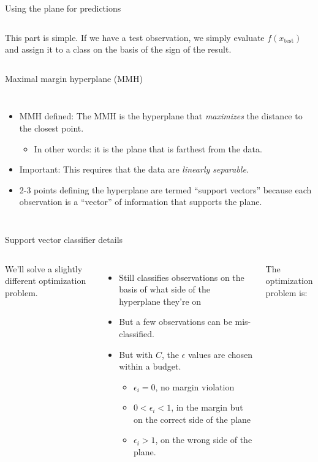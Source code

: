\documentclass[mathserif, aspectratio=169]{beamer}
\begin{document}
\begin{frame}{Using the plane for predictions}
	\begin{columns}
		This part is simple.  If we have a test observation, we simply evaluate $f(x_\text{test})$ and assign it to a class on the basis of the sign of the result.

	\end{columns}
\end{frame}


\begin{frame}{Maximal margin hyperplane (MMH)}

	\begin{columns}
		\column{0.5\textwidth}
		\begin{itemize}
			\item MMH defined: The MMH is the hyperplane that \textit{maximizes} the distance to the closest point.
			      \begin{itemize}
				      \item In other words: it is the plane that is farthest from the data.
			      \end{itemize}
			\item Important: This requires that the data are \textit{linearly separable.  }
			\item 2-3 points defining the hyperplane are termed ``support vectors'' because each observation is a ``vector'' of information that supports the plane.
		\end{itemize}
		\column{0.5\textwidth}

	\end{columns}
\end{frame}



\begin{frame}{Support vector classifier details}

	\begin{columns}
		We'll solve a slightly different optimization problem.
		\begin{itemize}
			\item Still classifies observations on the basis of what side of the hyperplane they're on
			\item But a few observations can be mis-classified.
			\item But with $C$, the $\epsilon$ values are chosen within a budget.
			      \begin{itemize}
				      \item $\epsilon_i = 0$, no margin violation
				      \item $0<\epsilon_i<1$, in the margin but on the correct side of the plane
				      \item  $\epsilon_i>1$, on the wrong side of the plane.
			      \end{itemize}
		\end{itemize}
		The optimization problem is:
		\vspace{40mm}
	\end{columns}
\end{frame}
\end{document}
